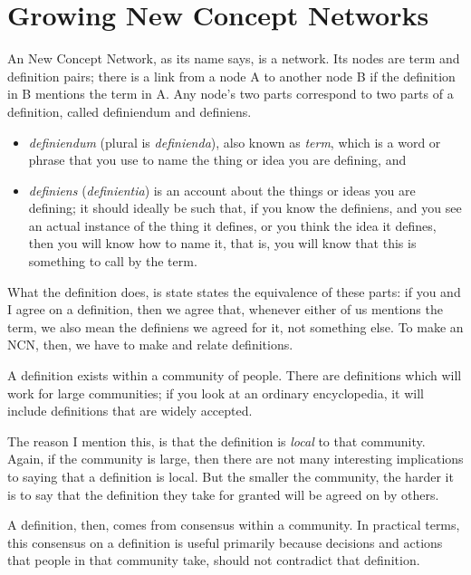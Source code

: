 \documentclass[graybox,envcountchap,sectrefs]{svmono}
\newcommand{\ncn}{NCN}
\newcommand{\ncnf}{New Concept Network}
\begin{document}
\printbibliography


\chapter{Growing \ncnf s}\label{c:case:defining-new-concept-networks}
An \ncnf, as its name says, is a network. Its nodes are term and definition pairs; there is a link from a node A to another node B if the definition in B mentions the term in A. Any node's two parts correspond to two parts of a definition, called definiendum and definiens.
\begin{itemize}
        \item \textit{definiendum} (plural is \textit{definienda}), also known as \textit{term}, which is a word or phrase that you use to name the thing or idea you are defining, and
        \item \textit{definiens} (\textit{definientia}) is an account about the things or ideas you are defining; it should ideally be such that, if you know the definiens, and you see an actual instance of the thing it defines, or you think the idea it defines, then you will know how to name it, that is, you will know that this is something to call by the term.
\end{itemize}

What the definition does, is state states the equivalence of these parts: if you and I agree on a definition, then we agree that, whenever either of us mentions the term, we also mean the definiens we agreed for it, not something else. To make an \ncn, then, we have to make and relate definitions.

A definition exists within a community of people. There are definitions which will work for large communities; if you look at an ordinary encyclopedia, it will include definitions that are widely accepted.

The reason I mention this, is that the definition is \textit{local} to that community. Again, if the community is large, then there are not many interesting implications to saying that a definition is local. But the smaller the community, the harder it is to say that the definition they take for granted will be agreed on by others. 

A definition, then, comes from consensus within a community. In practical terms, this consensus on a definition is useful primarily because decisions and actions that people in that community take, should not contradict that definition.
\end{document}
